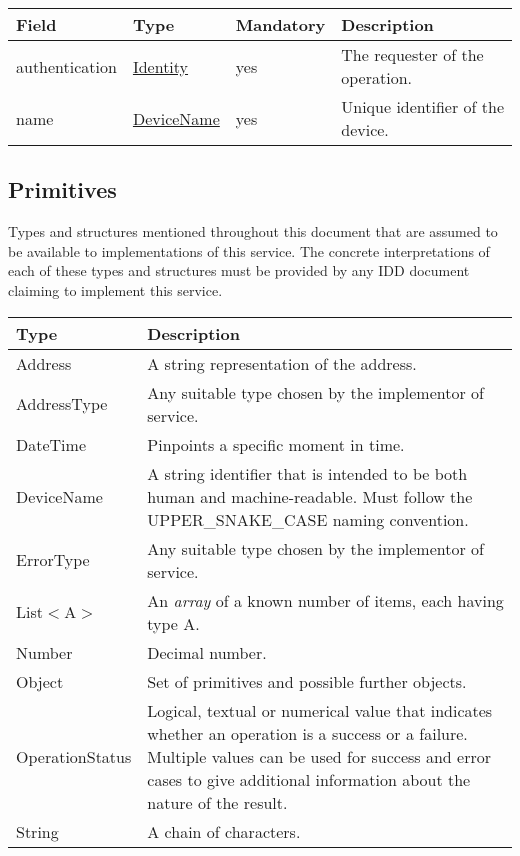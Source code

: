 \documentclass[a4paper]{arrowhead}
\newcommand{\pdef}[1]{{\textcolor{ArrowheadGrey}{#1\label{sec:model:primitives:#1}\label{sec:model:primitives:#1s}\label{sec:model:primitives:#1es}}}}
\newcommand{\pref}[1]{{\textcolor{ArrowheadGrey}{\hyperref[sec:model:primitives:#1]{#1}}}}
\begin{document}
 
\begin{table}[ht!]
\begin{tabularx}{\textwidth}{| p{3cm} | p{3cm} | p{2cm} | X |} \hline
\rowcolor{gray!33} Field & Type & Mandatory & Description \\ \hline
authentication & \hyperref[sec:model:Identity]{Identity} & yes & The requester of the operation. \\ \hline
name & \pref{DeviceName} & yes & Unique identifier of the device. \\ \hline
\end{tabularx}
\end{table}

\subsection{Primitives}
\label{sec:model:primitives}

Types and structures mentioned throughout this document that are assumed to be available to implementations of this service.
The concrete interpretations of each of these types and structures must be provided by any IDD document claiming to implement this service.


\begin{table}[ht!]
\begin{tabularx}{\textwidth}{| p{3cm} | X |} \hline
\rowcolor{gray!33} Type & Description \\ \hline
\pdef{Address}          & A string representation of the address. \\ \hline
\pdef{AddressType}      & Any suitable type chosen by the implementor of service. \\ \hline
\pdef{DateTime}         & Pinpoints a specific moment in time. \\ \hline
\pdef{DeviceName}       & A string identifier that is intended to be both human and machine-readable. Must follow the UPPER\_SNAKE\_CASE naming convention. \\ \hline
\pdef{ErrorType}        & Any suitable type chosen by the implementor of service. \\ \hline
\pdef{List}$<$A$>$      & An \textit{array} of a known number of items, each having type A. \\ \hline
\pdef{Number}           & Decimal number. \\ \hline
\pdef{Object}           & Set of primitives and possible further objects. \\ \hline
\pdef{OperationStatus}  & Logical, textual or numerical value that indicates whether an operation is a success or a failure. Multiple values can be used for success and error cases to give additional information about the nature of the result. \\ \hline
\pdef{String}           & A chain of characters. \\ \hline
\end{tabularx}
\end{table}
\end{document}
